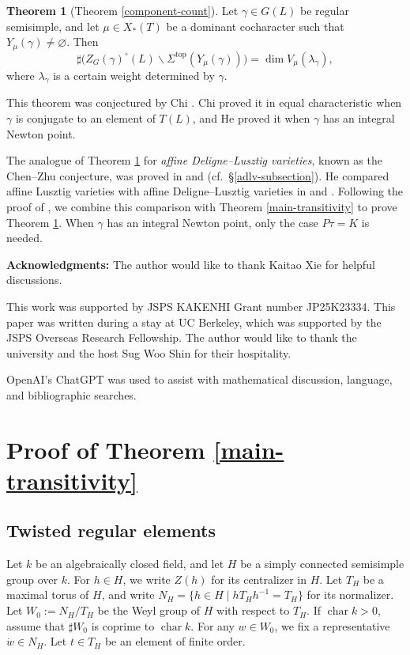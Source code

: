 \documentclass[12pt]{article}
\newcommand\tp{\mathrm{top}}
\theoremstyle{definition}
\newtheorem{thm}{Theorem}[section]
\begin{document}
\begin{thm}[Theorem \ref{component-count}]\label{main}
Let $\gamma\in G(L)$ be regular semisimple, and let $\mu\in X_*(T)$ be a dominant cocharacter such that $Y_\mu(\gamma)\ne\varnothing$.
Then
$$
\sharp\bigl(Z_G(\gamma)^\circ(L)\backslash\Sigma^{\tp}(Y_\mu(\gamma))\bigr)
=\dim V_\mu(\lambda_\gamma),
$$
where $\lambda_\gamma$ is a certain weight determined by $\gamma$.
\end{thm}

This theorem was conjectured by Chi \cite[Conjecture 3.9.8]{Chi22}. Chi \cite[Corollary 3.5.3]{Chi22} proved it in equal characteristic when $\gamma$ is conjugate to an element of $T(L)$, and He \cite[Theorem 3.7]{He25} proved it when $\gamma$ has an integral Newton point.

The analogue of Theorem \ref{main} for {\it affine Deligne--Lusztig varieties}, known as the Chen--Zhu conjecture, was proved in \cite{Nie22} and \cite{ZZ20} (cf.\ \S\ref{adlv-subsection}).
He compared affine Lusztig varieties with affine Deligne--Lusztig varieties in \cite{HeALV} and \cite{He25}.
Following the proof of \cite[Theorem 3.7]{He25}, we combine this comparison with Theorem \ref{main-transitivity} to prove Theorem \ref{main}.
When $\gamma$ has an integral Newton point, only the case $P\tau=K$ is needed.

\textbf{Acknowledgments:}
The author would like to thank Kaitao Xie for helpful discussions.

This work was supported by JSPS KAKENHI Grant number JP25K23334.
This paper was written during a stay at UC Berkeley, which was supported by the JSPS Overseas Research Fellowship.
The author would like to thank the university and the host Sug Woo Shin for their hospitality.

OpenAI's ChatGPT was used to assist with mathematical discussion, language, and bibliographic searches.

\section{Proof of Theorem \ref{main-transitivity}}
\label{integral-conjugacy}

\subsection{Twisted regular elements}
\label{twisted-regular-subsection}

Let $k$ be an algebraically closed field, and let $H$ be a simply connected semisimple group over $k$.
For $h\in H$, we write $Z(h)$ for its centralizer in $H$.
Let $T_H$ be a maximal torus of $H$, and write $N_H=\{h\in H\mid hT_H h^{-1}=T_H\}$ for its normalizer.
Let $W_0:=N_H/T_H$ be the Weyl group of $H$ with respect to $T_H$.
If $\operatorname{char}k>0$, assume that $\sharp W_0$ is coprime to $\operatorname{char}k$.
For any $w\in W_0$, we fix a representative $\dot w\in N_H$.
Let $t\in T_H$ be an element of finite order.
\end{document}
